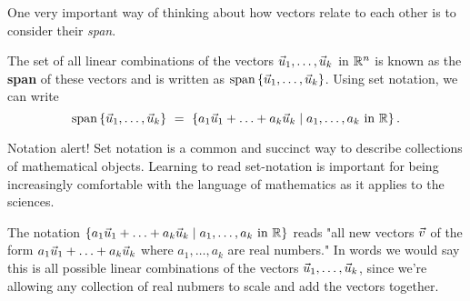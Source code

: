 \documentclass{ximera}
\begin{document}
\begin{exploration}

One very important way of thinking about how vectors relate to each other is to consider their \emph{span}.


\begin{definition}
  The set of all linear combinations of the vectors
  $\vec{u}_1, \ldots,\vec{u}_k$ in $\mathbb{R}^n$ is known as the
  \textbf{span}%
   of these vectors and is written as
  $\text{span}\left\{\vec{u}_1,\ldots,\vec{u}_k\right\}$. Using set notation, we
  can write
  \begin{equation*}
    \text{span}\left\{\vec{u}_1,\ldots,\vec{u}_k\right\}
    ~=~ \left\{a_1\vec{u}_1+\ldots+a_k\vec{u}_k \mid a_1,\ldots,a_k\text{ in }\mathbb{R}\right\}.
  \end{equation*}
  \begin{hint}
  
    Notation alert! Set notation is a common and succinct way to describe collections of mathematical objects. Learning to read set-notation is important for being increasingly comfortable with the language of mathematics as it applies to the sciences.

    The notation $\left\{a_1\vec{u}_1+\ldots+a_k\vec{u}_k \mid a_1,\ldots,a_k\text{ in }\mathbb{R}\right\}$ reads "all new vectors $\vec{v}$ of the form $a_1\vec{u}_1+\ldots+a_k\vec{u}_k$ where $a_1,\ldots,a_k$ are real numbers." In words we would say this is all possible linear combinations of the vectors $\vec{u}_1,\ldots,\vec{u}_k$, since we're allowing any collection of real nubmers to scale and add the vectors together.

  \end{hint}
\end{definition}


\end{exploration}
\end{document}
